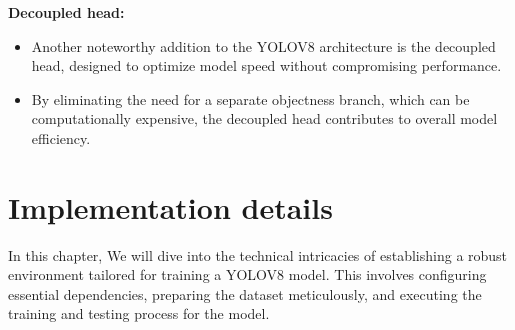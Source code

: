 \documentclass[12 pt]{report}
\begin{document}
{\begin{justify}
\item \textbf{Decoupled head:}
    \begin{itemize}
        \item Another noteworthy addition to the YOLOV8 architecture is the decoupled head, designed to optimize model speed without compromising performance.
        \item By eliminating the need for a separate objectness branch, which can be computationally expensive, the decoupled head contributes to overall model efficiency.
    \end{itemize}
  \end{justify}
}

\newpage
\chapter{Implementation details}
\justify
In this chapter, We will dive into the technical intricacies of establishing a robust environment tailored for training a YOLOV8 model. This involves configuring essential dependencies, preparing the dataset meticulously, and executing the training and testing process for the model.
\end{document}
